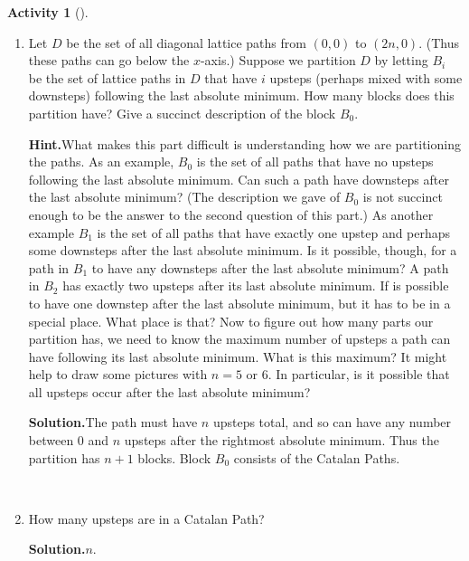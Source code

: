 \documentclass[10pt,]{book}
\theoremstyle{plain}
\theoremstyle{definition}
\newtheorem{activity}[project]{Activity}
\numberwithin{equation}{chapter}
\begin{document}
\begin{activity}[]
\begin{enumerate}[label=(\alph*)]
~\par
\item Let \(D\) be the set of all diagonal lattice paths from \((0,0)\) to \((2n,0)\).  (Thus these paths can go below the \(x\)-axis.) Suppose we partition \(D\) by letting \(B_i\) be the set of lattice paths in \(D\) that have \(i\) upsteps (perhaps mixed with some downsteps) following the last absolute minimum.  How many blocks does this partition have?  Give a succinct description of the block \(B_0\).%
\par\medskip\noindent%
\textbf{Hint.}\quad What makes this part difficult is understanding how we are partitioning the paths. As an example, \(B_0\) is the set of all paths that have no upsteps following the last absolute minimum. Can such a path have downsteps after the last absolute minimum? (The description we gave of \(B_0\) is not succinct enough to be the answer to the second question of this part.) As another example \(B_1\) is the set of all paths that have exactly one upstep and perhaps some downsteps after the last absolute minimum. Is it possible, though, for a path in \(B_1\) to have any downsteps after the last absolute minimum? A path in \(B_2\) has exactly two upsteps after its last absolute minimum. If is possible to have one downstep after the last absolute minimum, but it has to be in a special place. What place is that? Now to figure out how many parts our partition has, we need to know the maximum number of upsteps a path can have following its last absolute minimum. What is this maximum? It might help to draw some pictures with \(n = 5\) or \(6\). In particular, is it possible that all upsteps occur after the last absolute minimum?%
\par\medskip\noindent%
\textbf{Solution.}\quad The path must have \(n\) upsteps total, and so can have any number between 0 and \(n\) upsteps after the rightmost absolute minimum. Thus the partition has \(n+1\) blocks. Block \(B_0\) consists of the Catalan Paths.%

~\par
\item How many upsteps are in a Catalan Path?%
\par\medskip\noindent%
\textbf{Solution.}\quad \(n\).%


\end{enumerate}
\end{activity}
\end{document}

